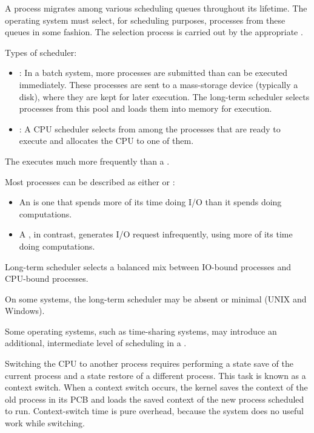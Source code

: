       \par A process migrates among various scheduling queues throughout its
        lifetime. The operating system must select, for scheduling purposes,
        processes from these queues in some fashion. The selection process is
        carried out by the appropriate .
      \par Types of scheduler:
      \begin{itemize}
        \item {}: In a batch system, more
          processes are submitted than can be executed immediately. These
          processes are sent to a mass-storage device (typically a disk), where
          they are kept for later execution. The long-term scheduler selects processes from this pool and loads them into memory for execution.
        \item {}: A CPU scheduler selects
          from among the processes that are ready to execute and allocates the
          CPU to one of them.
      \end{itemize}
      \par The  executes much more frequently than a
        .
      \par Most processes can be described as either  or :
      \begin{itemize}
        \item An  is one that spends more of its time
          doing I/O than it spends doing computations.
        \item A , in contrast, generates I/O request
          infrequently, using more of its time doing computations.
      \end{itemize}
      \par Long-term scheduler selects a balanced mix between IO-bound processes and CPU-bound processes.
      \par On some systems, the long-term scheduler may be absent or minimal (UNIX and Windows).
      \par Some operating systems, such as time-sharing systems, may introduce an additional, intermediate level of scheduling in a .

    \par Switching the CPU to another process requires performing a state save of the current process and a state restore of a different process. This task is known as a context switch. When a context switch occurs, the kernel saves the context of the old process in its PCB and loads the saved context of the new process scheduled to run. Context-switch time is pure overhead, because the system does no useful work while switching.

